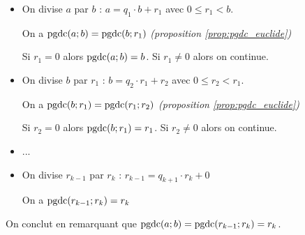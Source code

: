 \vspace{-1mm}
\begin{itemize}
\item On divise $a$ par $b$ : $a=q_1\cdot b+r_1$ avec $0\leqslant r_1< b$.
	
On a $\textrm{pgdc}(a;b)=\textrm{pgdc}(b;r_1)$ {\footnotesize\textsl{(proposition \ref{prop:pgdc_euclide})}}

Si $r_1=0$ alors $\textrm{pgdc}(a;b)=b$. Si $r_1\neq 0$ alors on continue.

\item On divise $b$ par $r_1$ : $b=q_2\cdot r_1+r_2$ avec $0\leqslant r_2< r_1$.
	
	On a $\textrm{pgdc}(b;r_1)=\textrm{pgdc}(r_1;r_2)$ {\footnotesize\textsl{(proposition \ref{prop:pgdc_euclide})}}
	
Si $r_2=0$ alors $\textrm{pgdc}(b;r_1)=r_1$. Si $r_2\neq 0$ alors on continue.

%	
%	
%	

\item $...$

\newcommand{\insertun}{\begin{minipage}{0.1\textwidth}
\centering\tiny dernier

reste non-nul

\vspace{1mm}
\end{minipage}}


%	
%	

\item On divise $r_{k-1}$ par $r_k$ : $r_{k-1}=q_{k+1}\cdot r_k+0$ 
	
	On a $\textrm{pgdc}(r_{k-1};r_k)=r_k$ 
	
\end{itemize} 

On conclut en remarquant que $\textrm{pgdc}(a;b)=\textrm{pgdc}(r_{k-1};r_k)=r_k$.

